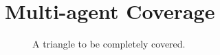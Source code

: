 \documentclass[letterpaper,12pt,titlepage,oneside,final]{book}
\begin{document}
\section{Multi-agent Coverage}
\label{sec:multi-agent_coverage}

%
\begin{figure}
	\centering
	
	\caption{A triangle to be completely covered.}
	\label{fig:triangle_1}
\end{figure}




\cleardoublepage %
\renewcommand*{\bibname}{References}




\nocite{*}
\end{document}
